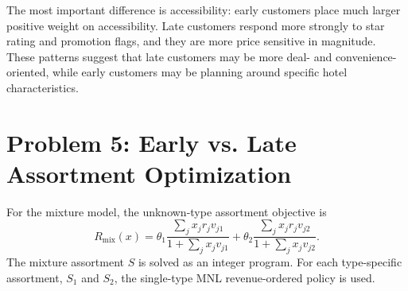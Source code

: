\documentclass[11pt]{article}
\begin{document}
\begin{table}[H]
\centering
\caption{Problem 4 coefficient comparison by reservation timing.}
\end{table}

The most important difference is accessibility: early customers place much larger positive weight on accessibility. Late customers respond more strongly to star rating and promotion flags, and they are more price sensitive in magnitude. These patterns suggest that late customers may be more deal- and convenience-oriented, while early customers may be planning around specific hotel characteristics.

\section{Problem 5: Early vs. Late Assortment Optimization}

For the mixture model, the unknown-type assortment objective is
\[
R_{\text{mix}}(x)
= \theta_1
\frac{\sum_j x_j r_j v_{j1}}{1 + \sum_j x_j v_{j1}}
+ \theta_2
\frac{\sum_j x_j r_j v_{j2}}{1 + \sum_j x_j v_{j2}}.
\]
The mixture assortment $S$ is solved as an integer program. For each type-specific assortment, $S_1$ and $S_2$, the single-type MNL revenue-ordered policy is used.

\begin{table}[H]
\centering
\caption{Problem 5 assortment results for early vs. late reservations.}
\end{table}
\end{document}
